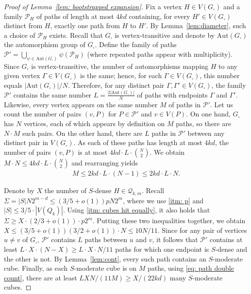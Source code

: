 \documentclass{article}
\theoremstyle{definition}
\newcommand{\cP}{\mathcal{P}}
\newcommand{\cQ}{\mathcal{Q}}
\begin{document}
\begin{proof}[Proof of Lemma~\ref{lem: bootstrapped expansion}]
Fix a vertex $H\in V(G_{\square})$ and a family $\cP_H$ of paths of length at most $4kd$ containing, for every $H'\in V(G_{\square})$ distinct from $H$, exactly one path from $H$ to $H'$. 
By Lemma~\ref{lem:diameter}, such a choice of $\cP_H$ exists. Recall that $G_\square$ is vertex-transitive and denote by $\mathrm{Aut}(G_{\square})$ the automorphism group of $G_{\square}$. 
Define the family of paths $\cP'=\bigcup_{\psi\in\mathrm{Aut}(G_{\square})}\psi(\cP_H)$ (where repeated paths appear with multiplicity). Since $G_{\square}$ is vertex-transitive, the number of automorphisms mapping $H$ to any given vertex $\Gamma\in V(G_{\square})$ is the same; hence, for each $\Gamma\in V(G_{\square})$, this number equals $|\mathrm{Aut}(G_{\square})|/N$. Therefore, for any distinct pair $\Gamma,\Gamma'\in V(G_{\square})$, the family $\cP'$ contains the same number $L=\frac{2|\mathrm{Aut}(G_{\square})|}{N}$ of paths with endpoints $\Gamma$ and $\Gamma'$. Likewise, every vertex appears on the same number $M$ of paths in $\cP'$. Let us count the number of pairs $(v,P)$ for $P\in \cP'$ and $v\in V(P)$.
On one hand, $G_\square$ has $N$ vertices, each of which appears by definition on $M$ paths, so there are $N\cdot M$ such pairs. 
On the other hand, there are $L$ paths in $\cP'$ between any distinct pair in $V(G_\square)$. As each of these paths has length at most $4kd$, the number of pairs $(v,P)$ is at most $4kd\cdot L\cdot \binom{N}{2}$. We obtain $M\cdot N\leq 4kd \cdot L\cdot \binom{N}{2}$ and rearranging yields 
\begin{align}\label{eq: path double count}
    M\leq 2kd\cdot L\cdot (N-1)\leq 2kd\cdot L\cdot N.
\end{align}

Denote by $X$ the number of $S$-dense $H\in\cQ_{k,m}$. Recall $\Sigma=|S|N2^{m-d}\leq (3/5+o(1))pN2^{m}$, where we use \ref{itm: p} and $|S|\leq 3/5\cdot |V(Q_k)|$. Using \ref{itm: cubes hit equally}, it also holds that $\Sigma\geq X\cdot (2/3+o(1))\cdot p2^m$. 
Putting these two inequalities together, we obtain $X\leq (3/5+o(1))(3/2+o(1))\cdot N\leq 10N/11$. 
Since for any pair of vertices $u\neq v$ of $G_{\square}$, $\cP'$ contains $L$ paths between $u$ and $v$, 
it follows that $\cP'$ contains at least $L\cdot X\cdot (N-X)\ge L\cdot X\cdot N/11$ paths for which one endpoint is $S$-dense and the other is not. By Lemma~\ref{lem:cont}, every such path contains an $S$-moderate cube. 
Finally, as each $S$-moderate cube is on $M$ paths, using \eqref{eq: path double count}, there are at least $LXN/(11M)\geq X/(22kd)$ many $S$-moderate cubes. 


\end{proof}
\end{document}
